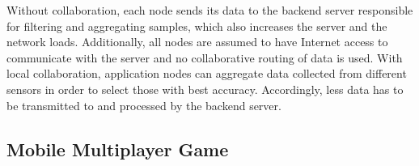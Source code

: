 Without collaboration, each node sends its data to the backend server responsible for filtering and aggregating samples, which also increases the server and the network loads. Additionally, all nodes are assumed to have Internet access to communicate with the server and no collaborative routing of data is used. With local collaboration, application nodes can aggregate data collected from different sensors in order to select those with best accuracy. Accordingly, less data has to be transmitted to and processed by the backend server.

%
%

\subsection{Mobile Multiplayer Game}

